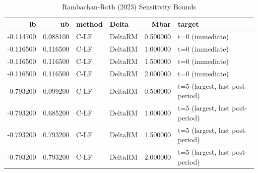 \begin{table}
\caption{Rambachan-Roth (2023) Sensitivity Bounds}
\label{tab:rr_bounds}
\begin{tabular}{rrllrl}
\toprule
lb & ub & method & Delta & Mbar & target \\
\midrule
-0.114700 & 0.088100 & C-LF & DeltaRM & 0.500000 & t=0 (immediate) \\
-0.116500 & 0.116500 & C-LF & DeltaRM & 1.000000 & t=0 (immediate) \\
-0.116500 & 0.116500 & C-LF & DeltaRM & 1.500000 & t=0 (immediate) \\
-0.116500 & 0.116500 & C-LF & DeltaRM & 2.000000 & t=0 (immediate) \\
-0.793200 & 0.099200 & C-LF & DeltaRM & 0.500000 & t=5 (largest, last post-period) \\
-0.793200 & 0.685200 & C-LF & DeltaRM & 1.000000 & t=5 (largest, last post-period) \\
-0.793200 & 0.793200 & C-LF & DeltaRM & 1.500000 & t=5 (largest, last post-period) \\
-0.793200 & 0.793200 & C-LF & DeltaRM & 2.000000 & t=5 (largest, last post-period) \\
\bottomrule
\end{tabular}
\end{table}
